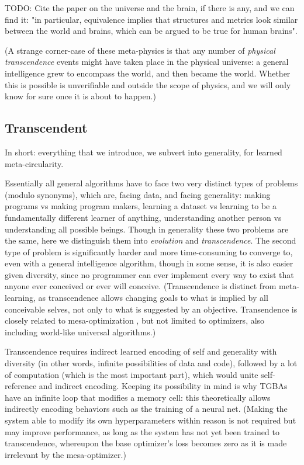 \documentclass{article}
\begin{document}
    TODO: Cite the paper on the universe and the brain, if there is any, and we can find it: "in particular, equivalence implies that structures and metrics look similar between the world and brains, which can be argued to be true for human brains".

(A strange corner-case of these meta-physics is that any number of \textit{physical transcendence} events might have taken place in the physical universe: a general intelligence grew to encompass the world, and then became the world. Whether this is possible is unverifiable and outside the scope of physics, and we will only know for sure once it is about to happen.)

\subsection{Transcendent}

In short: everything that we introduce, we subvert into generality, for learned meta-circularity.

Essentially all general algorithms have to face two very distinct types of problems (modulo synonyms), which are, facing data, and facing generality: making programs vs making program makers, learning a dataset vs learning to be a fundamentally different learner of anything, understanding another person vs understanding all possible beings. Though in generality these two problems are the same, here we distinguish them into \textit{evolution} and \textit{transcendence}. The second type of problem is significantly harder and more time-consuming to converge to, even with a general intelligence algorithm, though in some sense, it is also easier given diversity, since no programmer can ever implement every way to exist that anyone ever conceived or ever will conceive. (Transcendence is distinct from meta-learning, as transcendence allows changing goals to what is implied by all conceivable selves, not only to what is suggested by an objective. Transendence is closely related to mesa-optimization \cite{hubinger2019risks}, but not limited to optimizers, also including world-like universal algorithms.)

Transcendence requires indirect learned encoding of self and generality with diversity (in other words, infinite possibilities of data and code), followed by a lot of computation (which is the most important part), which would unite self-reference and indirect encoding. Keeping its possibility in mind is why TGBAs have an infinite loop that modifies a memory cell: this theoretically allows indirectly encoding behaviors such as the training of a neural net. (Making the system able to modify its own hyperparameters within reason is not required but may improve performance, as long as the system has not yet been trained to transcendence, whereupon the base optimizer's loss becomes zero as it is made irrelevant by the mesa-optimizer.)
\end{document}
